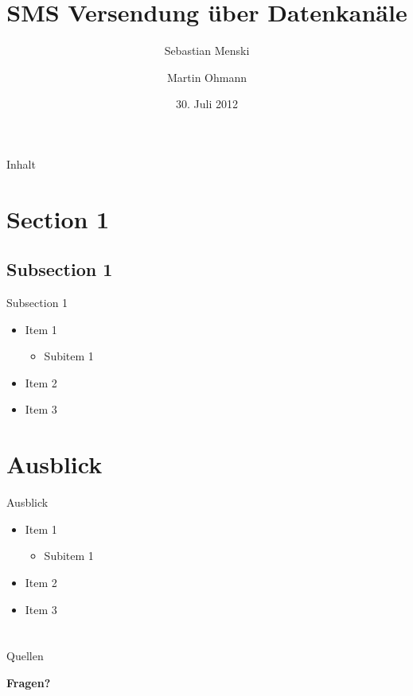 \documentclass{beamer}
\title[SMS Versendung über Datenkanäle]{SMS Versendung über Datenkanäle}
\author{Sebastian Menski \and Martin Ohmann}
\institute{Institut für Informatik -- Universität Potsdam}
\date{30. Juli 2012}
\begin{document}
\begin{frame}
\titlepage
\end{frame}


\begin{frame}{Inhalt}
\tableofcontents
\end{frame}

\section{Section 1}

\subsection{Subsection 1}
\begin{frame}{Subsection 1}
	\begin{itemize}
		\item Item 1
		\begin{itemize}
			\item Subitem 1
		\end{itemize}
		\item Item 2
		\item Item 3
	\end{itemize}
\end{frame}

\section{Ausblick}
\begin{frame}{Ausblick}
	\begin{itemize}
		\item Item 1
		\begin{itemize}
			\item Subitem 1
		\end{itemize}
		\item Item 2
		\item Item 3
	\end{itemize}
\end{frame}


\section{}

\begin{frame}{Quellen}	
	\scriptsize{
		\nocite{author1:title1,author1:title2}
		
	}
\end{frame}


\begin{frame}
	\begin{center}
	\Huge{\textbf{Fragen?}}
	\end{center}
\end{frame}
\end{document}
